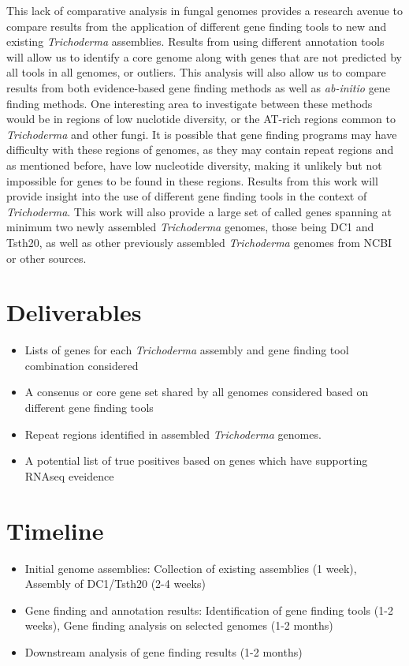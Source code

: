 \documentclass[12pt]{article}
\begin{document}
This lack of comparative analysis in fungal genomes provides a
research avenue to compare results from the application of different
gene finding tools to new and existing \textit{Trichoderma}
assemblies. Results from using different annotation tools will allow
us to identify a core genome along with genes that are not predicted
by all tools in all genomes, or outliers. This analysis will also
allow us to compare results from both evidence-based gene finding
methods as well as \textit{ab-initio} gene finding methods. One
interesting area to investigate between these methods would be in
regions of low nuclotide diversity, or the AT-rich regions common to
\textit{Trichoderma} and other fungi. It is possible that gene finding
programs may have difficulty with these regions of genomes, as they
may contain repeat regions and as mentioned before, have low
nucleotide diversity, making it unlikely but not impossible for genes
to be found in these regions. Results from this work will provide
insight into the use of different gene finding tools in the context of
\textit{Trichoderma}. This work will also provide a large set of
called genes spanning at minimum two newly assembled
\textit{Trichoderma} genomes, those being DC1 and Tsth20, as well as
other previously assembled \textit{Trichoderma} genomes from NCBI or
other sources.

\section{Deliverables}
\begin{itemize}
\item Lists of genes for each \textit{Trichoderma} assembly and gene
  finding tool combination considered
\item A consenus or core gene set shared by all genomes considered
  based on different gene finding tools
\item Repeat regions identified in assembled \textit{Trichoderma}
  genomes.
\item A potential list of true positives based on genes which have
  supporting RNAseq eveidence
\end{itemize}

\section{Timeline}
\begin{itemize}
\item Initial genome assemblies: Collection of existing assemblies (1 week), Assembly of DC1/Tsth20 (2-4 weeks)
\item Gene finding and annotation results: Identification of gene finding tools (1-2 weeks), Gene finding analysis on selected genomes (1-2 months)
\item Downstream analysis of gene finding results (1-2 months)
\end{itemize}
\end{document}
